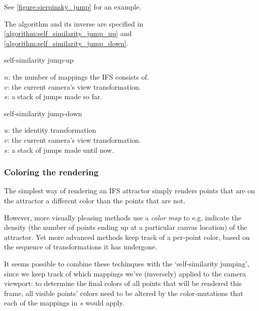\documentclass[11pt]{article}
\begin{document}
See \autoref{figure:sierpinsky_jump} for an example. 

The algorithm and its inverse are specified in \autoref{algorithm:self_similarity_jump_up} and \autoref{algorithm:self_similarity_jump_down}.

\begin{algorithm}
\caption{self-similarity jump-up}
\label{algorithm:self_similarity_jump_up}
  $n$: the number of mappings the IFS consists of. \\
  $v$: the current camera's view transformation. \\
  $s$: a stack of jumps made so far. \\
\end{algorithm}

\begin{algorithm}
\caption{self-similarity jump-down}
\label{algorithm:self_similarity_jump_down}
  $u$: the identity transformation \\
  $v$: the current camera's view transformation. \\
  $s$: a stack of jumps made until now. \\
\end{algorithm}

\subsubsection{Coloring the rendering}
\label{sec:org8082244}
\label{subsection:coloring}

The simplest way of rendering an IFS attractor simply renders points that are on the attractor a different color
than the points that are not.

However, more visually pleasing methods use a \emph{color map} to e.g. indicate the density (the number of points ending up at a particular canvas location) of the attractor.
Yet more advanced methods \cite{draves2003fractal} keep track of a per-point color, based on the sequence of transformations it has undergone.

It seems possible to combine these techinques with the `self-similarity jumping', since we keep track of which mappings we've (inversely) applied to the camera viewport:
to determine the final colors of all points that will be rendered this frame, 
all visible points' colors need to be altered by the color-mutations that each of the mappings in \(s\) would apply.
\end{document}
